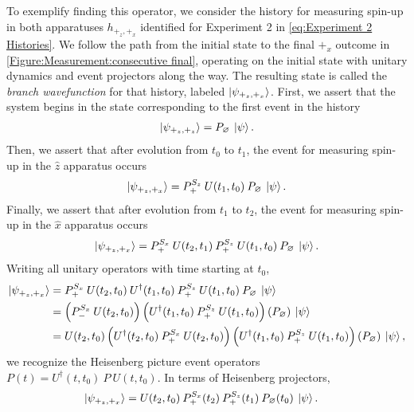 To exemplify finding this operator, we consider the history for measuring spin-up in both apparatuses $h_{+_z, +_x}$ identified for Experiment 2 in \autoref{eq:Experiment 2 Histories}. We follow the path from the initial state to the final $+_x$ outcome in \autoref{Figure:Measurement:consecutive final}, operating on the initial state with unitary dynamics and event projectors along the way. The resulting state is called the \textit{branch wavefunction} for that history, labeled $\ket{\psi_{+_z, +_x}}$.  First, we assert that the system begins in the state corresponding to the first event in the history
\begin{align}
  \ket{\psi_{+_z, +_z}} = P_\varnothing \: \ket{\psi}.
\end{align}
Then, we assert that after evolution from $t_0$ to $t_1$, the event for measuring spin-up in the $\hat{z}$ apparatus occurs
\begin{align}
  \ket{\psi_{+_z, +_x}} = P^{S_z}_+ \: U(t_1, t_0) \: P_\varnothing \: \ket{\psi}.
\end{align}
Finally, we assert that after evolution from $t_1$ to $t_2$, the event for measuring spin-up in the $\hat{x}$ apparatus occurs
\begin{align}
  \ket{\psi_{+_z, +_x}} = P^{S_x}_+ \: U(t_2, t_1) \: P^{S_z}_+ \: U(t_1, t_0) \: P_\varnothing \: \ket{\psi}.
\end{align}
Writing all unitary operators with time starting at $t_0$,
\begin{align}
  \ket{\psi_{+_z, +_x}} &= P^{S_x}_+ \: U(t_2, t_0) \: U^\dagger(t_1, t_0) \: P^{S_z}_+ \: U(t_1, t_0) \: P_\varnothing \: \ket{\psi} \\ \nonumber
  &= \left(P^{S_x}_- \: U(t_2, t_0) \right) \left( U^\dagger(t_1, t_0) \: P^{S_z}_+ \: U(t_1, t_0) \right) \left( P_\varnothing \right) \: \ket{\psi} \\ \nonumber
  &= U(t_2, t_0)\left(U^\dagger(t_2, t_0) \: P^{S_x}_+ \: U(t_2, t_0) \right) \left( U^\dagger(t_1, t_0) \: P^{S_z}_+ \: U(t_1, t_0) \right) \left( P_\varnothing \right) \: \ket{\psi},
\end{align}
we recognize the Heisenberg picture event operators ${P}(t) = U^\dagger(t, t_0) \: P \: U(t, t_0)$. In terms of Heisenberg projectors,
\begin{align} \label{eq:branch wavefunction}
  \ket{\psi_{+_z, +_x}} &= U(t_2, t_0) \: {P^{S_x}_+(t_2)} \: {P^{S_z}_+(t_1)} \: {P_\varnothing(t_0)} \: \ket{\psi}.
\end{align}

